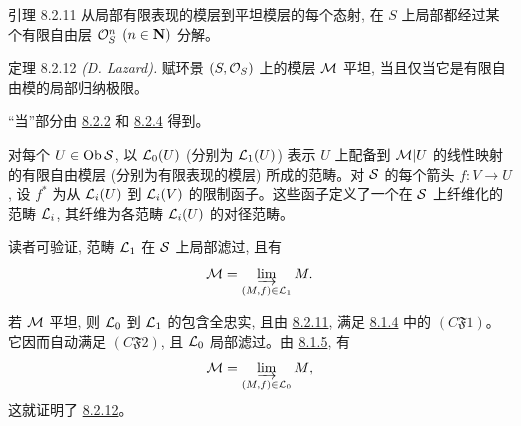 \begin{enonce*}{引理 8.2.11}
从局部有限表现的模层到平坦模层的每个\pageoriginale 态射, 在 $S$ 上局部都经过某个有限自由层 ${\mathcal O}_S^n$ $(n\in\mathbf{N})$ 分解。
\end{enonce*}

\begin{enonce*}{定理 8.2.12}
\emph{(D. Lazard).} 赋环景 $(S,{\mathcal O}_S)$ 上的模层 ${\mathcal M}$ 平坦, 当且仅当它是有限自由模的局部归纳极限。
\end{enonce*}

“当”部分由 \hyperref[V.thm8.2.2]{8.2.2} 和 \hyperref[V.prop8.2.4]{8.2.4} 得到。

对每个 $U\in\operatorname{Ob}{\mathcal S}$, 以 ${\mathcal L}_0(U)$ (分别为 ${\mathcal L}_1(U)$) 表示 $U$ 上配备到 ${\mathcal M}|U$ 的线性映射的有限自由模层 (分别为有限表现的模层) 所成的范畴。对 ${\mathcal S}$ 的每个箭头 $f:V\to U$, 设 $f^{\ast}$ 为从 ${\mathcal L}_i(U)$ 到 ${\mathcal L}_i(V)$ 的限制函子。这些函子定义了一个在 ${\mathcal S}$ 上纤维化的范畴 ${\mathcal L}_i$, 其纤维为各范畴 ${\mathcal L}_i(U)$ 的对径范畴。

读者可验证, 范畴 ${\mathcal L}_1$ 在 ${\mathcal S}$ 上局部滤过, 且有
$$
{\mathcal M}=\varinjlim_{(M,f)\in{\mathcal L}_1}M.
$$

若 ${\mathcal M}$ 平坦, 则 ${\mathcal L}_0$ 到 ${\mathcal L}_1$ 的包含全忠实, 且由 \hyperref[V.lem8.2.11]{8.2.11}, 满足 \hyperref[V.def8.1.4]{8.1.4} 中的 $(C\mathfrak{F}1)$。它因而自动满足 $(C\mathfrak{F}2)$, 且 ${\mathcal L}_0$ 局部滤过。由 \hyperref[V.prop8.1.5]{8.1.5}, 有
$$
{\mathcal M}=\varinjlim_{(M,f)\in{\mathcal L}_0}M{},
$$
这就证明了 \hyperref[V.thm8.2.12]{8.2.12}。


